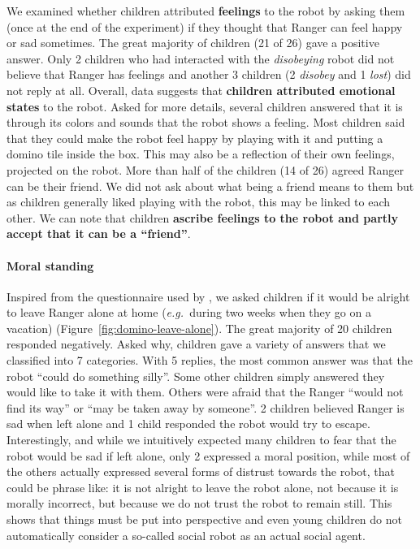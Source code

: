 \documentclass{sig-alternate}
\newcommand{\eg}{{\textit{e.g.~}}}
\begin{document}
We examined whether children attributed \textbf{feelings} to the robot by asking
them (once at the end of the experiment) if they thought that Ranger can feel
happy or sad sometimes. The great majority of
children (21 of 26) gave a positive answer. Only 2 children who had interacted
with the \textit{disobeying} robot did not believe that Ranger has feelings and
another 3 children (2 \textit{disobey} and 1 \textit{lost}) did not reply at
all. Overall, data suggests that \textbf{children attributed emotional states}
to the robot. Asked for more details, several children answered that it is
through its colors and sounds that the robot shows a feeling. Most children said
that they could make the robot feel happy by playing with it and putting a
domino tile inside the box. This may also be a reflection of their own feelings,
projected on the robot.  More than half of the children (14 of 26) agreed Ranger
can be their friend. We did not ask about what being a friend means to them but
as children generally liked playing with the robot, this may be linked to each
other. We can note that children \textbf{ascribe feelings to the robot and
partly accept that it can be a ``friend''}.


\paragraph{Moral standing}

Inspired from the questionnaire used by \cite{kahn_jr._robotic_2006}, we asked
children if it would be alright to leave Ranger alone at home (\eg during two
weeks when they go on a vacation) (Figure~\ref{fig:domino-leave-alone}). The
great majority of 20 children responded negatively. Asked why, children gave a
variety of answers that we classified into 7 categories. With 5 replies, the
most common answer was that the robot ``could do something silly''. Some other
children simply answered they would like to take it with them. Others were
afraid that the Ranger ``would not find its way'' or ``may be taken away by
someone''. 2 children believed Ranger is sad when left alone and 1 child
responded the robot would try to escape. Interestingly, and while we intuitively
expected many children to fear that the robot would be sad if left alone, only 2
expressed a moral position, while most of the others actually expressed several
forms of distrust towards the robot, that could be phrase like: it is not
alright to leave the robot alone, not because it is morally incorrect, but
because we do not trust the robot to remain still. This shows that things must
be put into perspective and even young children do not automatically consider a
so-called social robot as an actual social agent.
\end{document}
